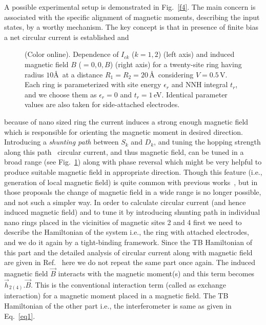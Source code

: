 \documentclass[doublecol]{epl2}
\begin{document}
A possible experimental setup is demonstrated in Fig.~\ref{f4}. The main
concern is associated with the specific alignment of magnetic moments, 
describing the input states, by a worthy mechanism. The key concept is that 
in presence of finite bias a net circular current is established and 
\begin{figure}[ht]
{\centering {}\par}
\caption{(Color online). Dependence of $I_{ck}$ ($k=1,2$) (left axis) and
induced magnetic field $B$ ($=0,0,B$) (right axis) for a twenty-site 
ring having radius $10$\AA$\,$ at a distance $R_1=R_2=20\,$\AA$\,$ 
considering $V=0.5\,$V. Each ring is parameterized with site energy 
$\epsilon_r$ and NNH integral $t_r$, and we choose them as $\epsilon_r=0$ 
and $t_r=1\,$eV. Identical parameter values are also taken for side-attached
electrodes.}
\label{f5}
\end{figure}
because of nano sized ring the current induces a strong enough magnetic 
field~\cite{cir7,cir8} which is responsible for orienting the magnetic
moment in desired direction. Introducing a {\em shunting path} between
$S_k$ and $D_k$, and tuning the hopping strength along this
path~\cite{shunt1,shunt2} circular current, and thus magnetic field, can
be tuned in a broad range (see Fig.~\ref{f5}) along with phase reversal 
which might be very helpful 
to produce suitable magnetic field in appropriate direction. Though this 
feature (i.e., generation of local magnetic field) is quite common with 
previous works~\cite{lidar,Per,mag2}, but in those proposals the change of 
magnetic field in a wide range is no longer possible, and not such a simpler
way. In order to calculate circular current (and hence induced magnetic 
field) and to tune it by introducing shunting path in individual nano rings 
placed in the vicinities of magnetic sites 2 and 4 first we need to describe
the Hamiltonian of the system i.e., the ring with attached electrodes, and
we do it again by a tight-binding framework. Since the TB Hamiltonian of this
part and the detailed analysis of circular current along with magnetic field
are given in Ref.~\cite{tC} here we do not repeat the same part once again.
The induced magnetic field $\vec{B}$ interacts with the magnetic moment(s) 
and this term becomes $\vec{h}_{2(4)}.\vec{B}$. This is the conventional 
interaction term (called as exchange interaction) for a magnetic 
moment placed in a magnetic field. The TB Hamiltonian of the other part 
i.e., the interferometer is same as given in Eq.~\ref{eq1}.
\end{document}
